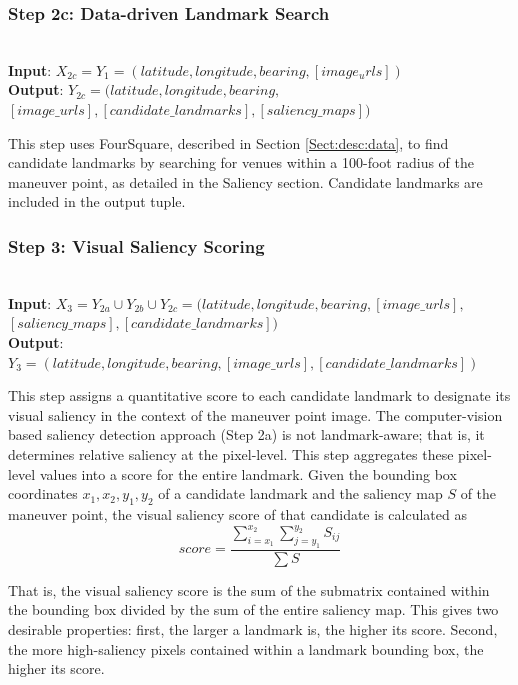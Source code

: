 \subsubsection*{Step 2c: Data-driven Landmark Search}~\\
\textbf{Input}: $X_{2c} = Y_1 = (latitude, longitude, bearing, [image_urls])$\\
\noindent\textbf{Output}: $Y_{2c} = (latitude, longitude, bearing,$ \\ $[image\_urls], [candidate\_landmarks], [saliency\_maps] )$

This step uses FourSquare, described in Section \ref{Sect:desc:data}, to find candidate landmarks by searching for venues within a 100-foot radius of the maneuver point, as detailed in the Saliency section. Candidate landmarks are included in the output tuple.

\subsubsection*{Step 3: Visual Saliency Scoring}~\\
\textbf{Input}: $X_3 = Y_{2a} \cup Y_{2b} \cup Y_{2c} = (latitude, longitude, bearing,  [image\_urls],$\\ $[saliency\_maps], [candidate\_landmarks] )$\\
\noindent\textbf{Output}: $Y_3 = (latitude, longitude, bearing,  [image\_urls], [candidate\_landmarks] )$ 

This step assigns a quantitative score to each candidate landmark to designate its visual saliency in the context of the maneuver point image. The computer-vision based saliency detection approach (Step 2a) is not landmark-aware; that is, it determines relative saliency at the pixel-level. This step aggregates these pixel-level values into a score for the entire landmark. Given the bounding box coordinates $x_1, x_2, y_1,y_2$ of a candidate landmark and the saliency map $S$ of the maneuver point, the visual saliency score of that candidate is calculated as
\begin{equation}
    score= \frac{\sum\limits_{i=x_1}^{x_2} \sum\limits_{j=y_1}^{y_2} S_{ij}}{\sum S}
\end{equation}

That is, the visual saliency score is the sum of the submatrix contained within the bounding box divided by the sum of the entire saliency map. This gives two desirable properties: first, the larger a landmark is, the higher its score. Second, the more high-saliency pixels contained within a landmark bounding box, the higher its score.

